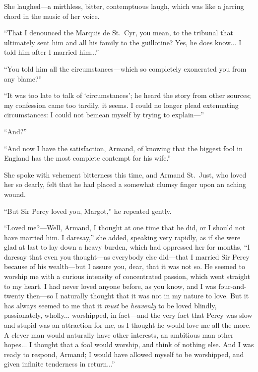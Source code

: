 \documentclass[paper=a5,BCOR=7mm,twoside,DIV=calc,12pt,usegeometry,chapterprefix,endperiod,headings=big]{scrbook}
\begin{document}
She laughed---a mirthless, bitter, contemptuous laugh, \newline which was like a jarring chord in the music of her voice.

\enquote{That I denounced the Marquis de St.~Cyr, you mean, to the tribunal that ultimately sent him and all his family to the guillotine? Yes, he does know... I told him after I married him...}

\enquote{You told him all the circumstances---which so completely exonerated you from any blame?}

\enquote{It was too late to talk of \enquote{circumstances}; he heard the story from other sources; my confession came too tardily, it seems. I could no longer plead extenuating circumstances: I could not bemean myself by trying to explain---}

\enquote{And?}

\enquote{And now I have the satisfaction, Armand, of knowing that the biggest fool in England has the most complete contempt for his wife.}

She spoke with vehement bitterness this time, and Armand St.~Just, who loved her so dearly, felt that he had placed a somewhat clumsy finger upon an aching wound.

\enquote{But Sir Percy loved you, Margot,} he repeated gently.

\enquote{Loved me?---Well, Armand, I thought at one time that he did, or I should not have married him. I daresay,} she added, speaking very rapidly, as if she were glad at last to lay down a heavy burden, which had oppressed her for months, \enquote{I daresay that even you thought---as everybody else did---that I married Sir Percy because of his wealth---but I assure you, dear, that it was not so. He seemed to worship me with a curious intensity of concentrated passion, which went straight to my heart. I had never loved anyone before, as you know, and I was four-and-twenty then---so I naturally thought that it was not in my nature to love. But it has always seemed to me that it \textit{must} be \textit{heavenly} to be loved blindly, passionately, wholly... worshipped, in fact---and the very fact that Percy was slow and stupid was an attraction for me, as I thought he would love me all the more. A clever man would naturally have other interests, an ambitious man other hopes... I thought that a fool would worship, and think of nothing else. And I was ready to respond, Armand; I would have allowed myself to be worshipped, and given infinite tenderness in return...}
\end{document}

